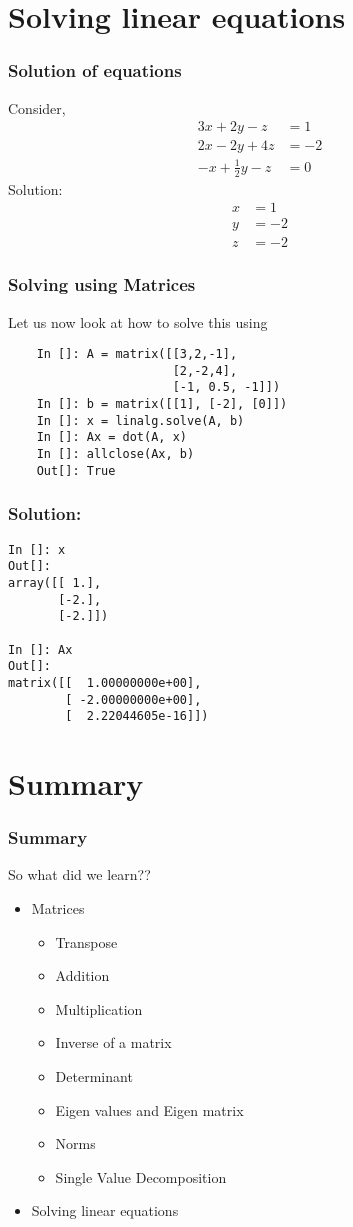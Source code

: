 \documentclass[14pt,compress]{beamer}
\newcommand{\kwrd}[1]{ \texttt{\textbf{\color{blue}{#1}}}  }
\begin{document}
\section{Solving linear equations}

\begin{frame}[fragile]
\frametitle{Solution of equations}
Consider,
  \begin{align*}
    3x + 2y - z  & = 1 \\
    2x - 2y + 4z  & = -2 \\
    -x + \frac{1}{2}y -z & = 0
  \end{align*}
Solution:
  \begin{align*}
    x & = 1 \\
    y & = -2 \\
    z & = -2
  \end{align*}
\end{frame}

\begin{frame}[fragile]
\frametitle{Solving using Matrices}
Let us now look at how to solve this using \kwrd{matrices}
  \begin{lstlisting}
    In []: A = matrix([[3,2,-1],
                       [2,-2,4],
                       [-1, 0.5, -1]])
    In []: b = matrix([[1], [-2], [0]])
    In []: x = linalg.solve(A, b)
    In []: Ax = dot(A, x)
    In []: allclose(Ax, b)
    Out[]: True
  \end{lstlisting}
\end{frame}

\begin{frame}[fragile]
\frametitle{Solution:}
\begin{lstlisting}
In []: x
Out[]: 
array([[ 1.],
       [-2.],
       [-2.]])

In []: Ax
Out[]: 
matrix([[  1.00000000e+00],
        [ -2.00000000e+00],
        [  2.22044605e-16]])
\end{lstlisting}
\end{frame}

\section{Summary}
\begin{frame}
  \frametitle{Summary}
So what did we learn??
  \begin{itemize}
  \item Matrices
    \begin{itemize}
      \item Transpose
      \item Addition
      \item Multiplication
      \item Inverse of a matrix
      \item Determinant
      \item Eigen values and Eigen matrix
      \item Norms
      \item Single Value Decomposition
    \end{itemize}
  \item Solving linear equations
  \end{itemize}
\end{frame}
\end{document}
